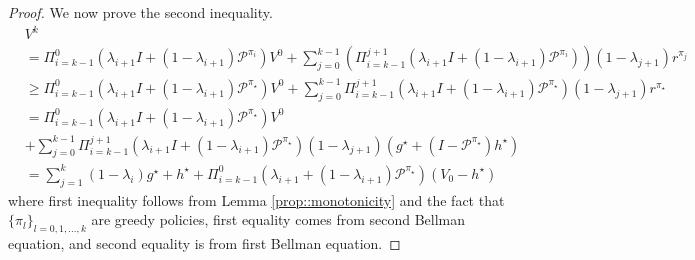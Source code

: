 \documentclass{article} %
\newcommand{\cP}{\mathcal{P}}
\newcommand*{\para}[1]{\left({#1}\right)}
\begin{document}
\begin{proof}
We now prove the second inequality. 
    \begin{align*}
        &V^k 
        \\&=\Pi^{0}_{i=k-1}(\lambda_{i+1}I+(1-\lambda_{i+1}) \cP^{\pi_i}) V^0+ \sum^{k-1}_{j=0}\para{\Pi_{i=k-1}^{j+1}(\lambda_{i+1}I+(1-\lambda_{i+1}) \cP^{\pi_i})}(1-\lambda_{j+1}) r^{\pi_j}\\
        &\ge \Pi^{0}_{i=k-1}(\lambda_{i+1}I+(1-\lambda_{i+1}) \cP^{\pi_{\star}}) V^0+ \sum^{k-1}_{j=0}\Pi_{i=k-1}^{j+1}(\lambda_{i+1}I+(1-\lambda_{i+1}) \cP^{\pi_{\star}})(1-\lambda_{j+1}) r^{\pi_{\star}} \\&= \Pi^{0}_{i=k-1}(\lambda_{i+1}I+(1-\lambda_{i+1}) \cP^{\pi_{\star}}) V^0\\&+ \sum^{k-1}_{j=0}\Pi_{i=k-1}^{j+1}(\lambda_{i+1}I+(1-\lambda_{i+1}) \cP^{\pi_{\star}})(1-\lambda_{j+1}) (g^{\star}+(I-\cP^{\pi_{\star}})h^{\star})
        \\&= \sum^{k}_{j=1} (1-\lambda_{i})g^{\star}+  h^{\star}+\Pi^{0}_{i=k-1}(\lambda_{i+1}+(1-\lambda_{i+1}) \cP^{\pi_{\star}})(V_0-h^{\star}) 
    \end{align*}
where first inequality follows from Lemma \ref{prop::monotonicity} and the fact that $\{\pi_l\}_{l=0,1,\dots,k}$ are greedy policies, first equality comes from second Bellman equation, and second equality is from first Bellman equation. 
\end{proof}
\end{document}

